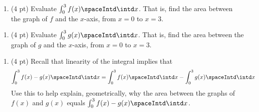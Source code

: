 \begin{enumerate}[label=(\alph*)]
\item\label{itm : ME3Q6a} (4 pt) Evaluate $\int_{0}^{3} f(x) \spaceIntd \intd x$. That is, find the area between the graph of $f$ and the $x$-axis, from $x = 0$ to $x = 3$.
\end{enumerate}




\begin{enumerate}[resume,label=(\alph*)]
\item\label{itm : ME3Q6b} (4 pt) Evaluate $\int_{0}^{3} g(x) \spaceIntd \intd x$. That is, find the area between the graph of $g$ and the $x$-axis, from $x = 0$ to $x = 3$.
\end{enumerate}




\begin{enumerate}[resume,label=(\alph*)]
\item\label{itm : ME3Q6c} (4 pt) Recall that linearity of the integral implies that
\begin{align}
\int_{0}^{3} f(x) - g(x) \spaceIntd \intd x
=
\int_{0}^{3} f(x) \spaceIntd \intd x - \int_{0}^{3} g(x) \spaceIntd \intd x%
\label{eq : ME3Q6c}
\end{align}
Use this to help explain, geometrically, why the area between the graphs of $f(x)$ and $g(x)$ equals $\int_{0}^{3} f(x) - g(x) \spaceIntd \intd x$.
\end{enumerate}

